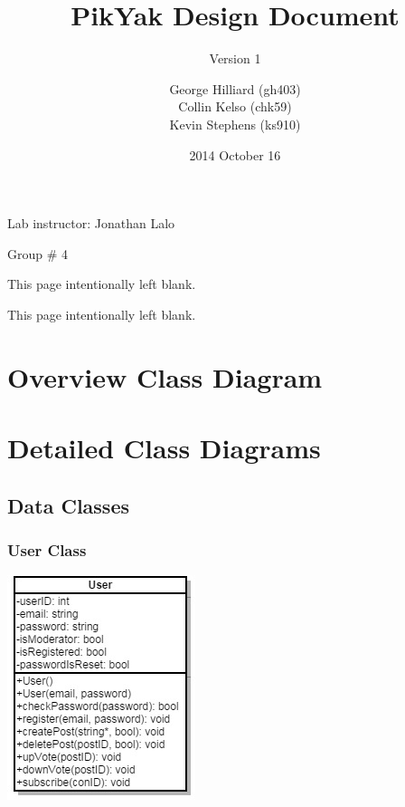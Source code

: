 \documentclass[11pt]{scrartcl}
\title{PikYak Design Document}
\subtitle{Version 1}
\author{
    George Hilliard (gh403) \\
    Collin Kelso (chk59) \\
    Kevin Stephens (ks910)
}
\date{2014 October 16}
\newcommand*{\blankpage}{%
\clearpage
\vspace*{\fill}
\centerline{This page intentionally left blank.}
\vspace{\fill}
\clearpage}
\let\stdsection\section
\renewcommand\section{\newpage\stdsection}
\begin{document}

\maketitle

\begin{center}
Lab instructor: Jonathan Lalo

Group \# 4
\end{center}

\blankpage

\tableofcontents

\blankpage


\section{Overview Class Diagram}

\section{Detailed Class Diagrams}
    \subsection{Data Classes}
        \subsubsection{User Class}

            \centerline{\includegraphics{diagrams/user-UML}}
\end{document}
